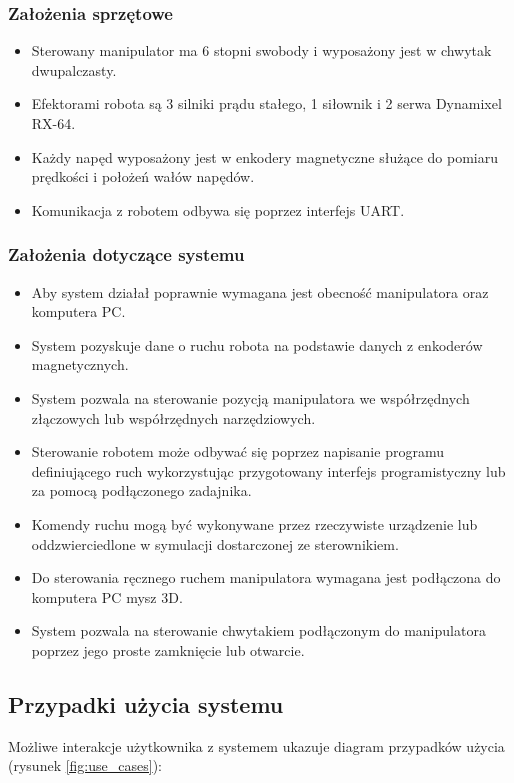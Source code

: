 \documentclass[a4paper, 12pt, twoside]{article}
\begin{document}
\subsubsection{Założenia sprzętowe}
\begin{itemize}
\item Sterowany manipulator ma 6 stopni swobody i wyposażony jest w chwytak dwupalczasty.
\item Efektorami robota są 3 silniki prądu stałego, 1 siłownik i 2 serwa Dynamixel RX-64.
\item Każdy napęd wyposażony jest w enkodery magnetyczne służące do pomiaru prędkości i położeń wałów napędów.
\item Komunikacja z robotem odbywa się poprzez interfejs UART.
\end{itemize}

\subsubsection{Założenia dotyczące systemu}
\begin{itemize}
\item Aby system działał poprawnie wymagana jest obecność manipulatora oraz komputera PC.
\item System pozyskuje dane o ruchu robota na podstawie danych z enkoderów magnetycznych.
\item System pozwala na sterowanie pozycją manipulatora we współrzędnych złączowych lub współrzędnych narzędziowych.
\item Sterowanie robotem może odbywać się poprzez napisanie programu definiującego ruch wykorzystując przygotowany interfejs programistyczny lub za pomocą podłączonego zadajnika.
\item Komendy ruchu mogą być wykonywane przez rzeczywiste urządzenie lub oddzwierciedlone w symulacji dostarczonej ze sterownikiem.
\item Do sterowania ręcznego ruchem manipulatora wymagana jest podłączona do komputera PC mysz 3D.
\item System pozwala na sterowanie chwytakiem podłączonym do manipulatora poprzez jego proste zamknięcie lub otwarcie.
\end{itemize}

\subsection{Przypadki użycia systemu}
Możliwe interakcje użytkownika z systemem  ukazuje diagram przypadków użycia (rysunek \ref{fig:use_cases}):
\end{document}

